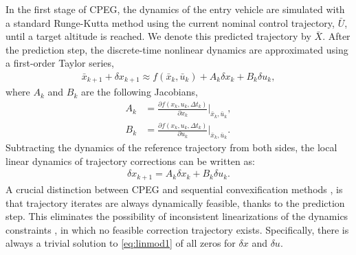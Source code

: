 In the first stage of CPEG, the dynamics of the entry vehicle are simulated with a standard Runge-Kutta method using the current nominal control trajectory, $\bar{U}$, until a target altitude is reached. We denote this predicted trajectory by $\bar{X}$. After the prediction step, the discrete-time nonlinear dynamics are approximated using a first-order Taylor series,
\begin{align}
    \bar{x}_{k+1} + \delta x_{k+1} \approx f(\bar{x}_k,\bar{u}_k) + A_k \delta x_k + B_k \delta u_k,
\end{align}
where $A_k$ and $B_k$ are the following Jacobians,
\begin{align}
    A_k &= \frac{\partial f(x_k,u_k,\Delta t_k)}{\partial x_k} \bigg\rvert _{\bar{x}_k,\bar{u}_k}, \label{jacob1}\\
    B_k &= \frac{\partial f(x_k,u_k,\Delta t_k)}{\partial u_k}\bigg\rvert _{\bar{x}_k,\bar{u}_k}. \label{jacob2}
\end{align}
Subtracting the dynamics of the reference trajectory from both sides, the local linear dynamics of trajectory corrections can be written as:
\begin{align}
    \delta x_{k+1} = A_k \delta x_k + B_k \delta u_k.\label{eq:linmod1}
\end{align}
A crucial distinction between CPEG and sequential convexification methods \cite{wang2016,malyuta2021,mao2019}, is that trajectory iterates are always dynamically feasible, thanks to the prediction step. This eliminates the possibility of inconsistent linearizations of the dynamics constraints \cite{nocedal2006}, in which no feasible correction trajectory exists. Specifically, there is always a trivial solution to \eqref{eq:linmod1} of all zeros for $\delta x$ and $\delta u$.

